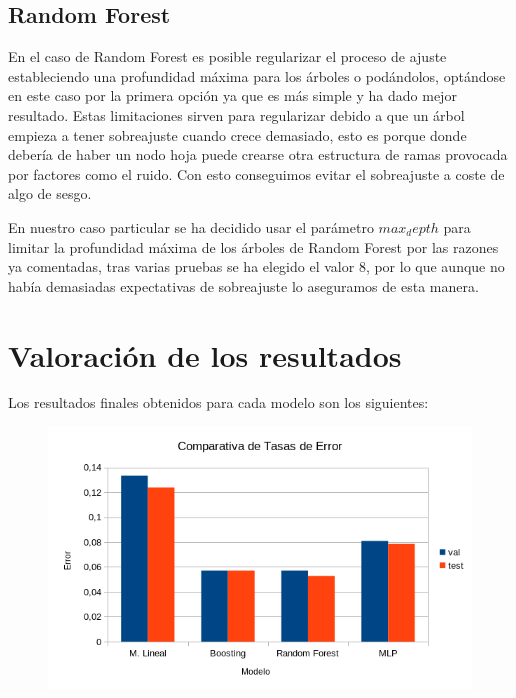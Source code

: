 \documentclass{article}
\begin{document}
	\subsection{Random Forest}
	En el caso de Random Forest es posible regularizar el proceso de ajuste estableciendo una profundidad máxima para los árboles o podándolos, optándose en este caso por la primera opción ya que es más simple y ha dado mejor resultado. Estas limitaciones sirven para regularizar debido a que un árbol empieza a tener sobreajuste cuando crece demasiado, esto es porque donde debería de haber un nodo hoja puede crearse otra estructura de ramas provocada por factores como el ruido. Con esto conseguimos evitar el sobreajuste a coste de algo de sesgo.
	\par
	En nuestro caso particular se ha decidido usar el parámetro $max_depth$ para limitar la profundidad máxima de los árboles de Random Forest por las razones ya comentadas, tras varias pruebas se ha elegido el valor 8, por lo que aunque no había demasiadas expectativas de sobreajuste lo aseguramos de esta manera.
	
	\section{Valoración de los resultados} %
	Los resultados finales obtenidos para cada modelo son los siguientes:
	
\begin{figure}[H]
  \includegraphics[width=\linewidth]{Imagenes/CE.png}
  \label{fig:boat1}
\end{figure}
\end{document}
